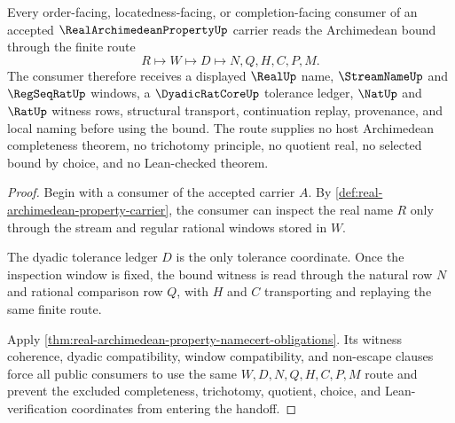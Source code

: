 \begin{theorem}
\label{thm:real-archimedean-property-dyadic-bound-handoff}
Every order-facing, locatedness-facing, or completion-facing consumer of an accepted $\RealArchimedeanPropertyUp$ carrier reads the Archimedean bound through the finite route
$$
R \longmapsto W \longmapsto D \longmapsto N,Q,H,C,P,M .
$$
The consumer therefore receives a displayed $\RealUp$ name, $\StreamNameUp$ and $\RegSeqRatUp$ windows, a $\DyadicRatCoreUp$ tolerance ledger, $\NatUp$ and $\RatUp$ witness rows, structural transport, continuation replay, provenance, and local naming before using the bound. The route supplies no host Archimedean completeness theorem, no trichotomy principle, no quotient real, no selected bound by choice, and no Lean-checked theorem.
\end{theorem}
\begin{proof}
Begin with a consumer of the accepted carrier $A$. By \autoref{def:real-archimedean-property-carrier}, the consumer can inspect the real name $R$ only through the stream and regular rational windows stored in $W$.

The dyadic tolerance ledger $D$ is the only tolerance coordinate. Once the inspection window is fixed, the bound witness is read through the natural row $N$ and rational comparison row $Q$, with $H$ and $C$ transporting and replaying the same finite route.

Apply \autoref{thm:real-archimedean-property-namecert-obligations}. Its witness coherence, dyadic compatibility, window compatibility, and non-escape clauses force all public consumers to use the same $W,D,N,Q,H,C,P,M$ route and prevent the excluded completeness, trichotomy, quotient, choice, and Lean-verification coordinates from entering the handoff.
\end{proof}


